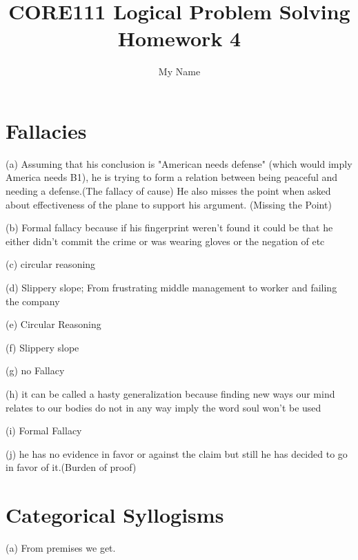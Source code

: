 \documentclass{article}
\title{CORE111 Logical Problem Solving\\Homework 4}
\author{My Name}
\begin{document}
\maketitle

\section{Fallacies}

(a) Assuming that his conclusion is "American needs defense" (which would imply America needs B1), he is trying to form a relation between being peaceful and needing a defense.(The fallacy of cause) He also misses the point when asked about effectiveness of the plane to support his argument. (Missing the Point)

(b) Formal fallacy because if his fingerprint weren't found it could be that he either didn't commit the crime or was wearing gloves or the negation of etc 

(c) circular reasoning

(d) Slippery slope; From frustrating middle management to worker and failing the company

(e) Circular Reasoning

(f) Slippery slope

(g) no Fallacy 

(h) it can be called a hasty generalization because finding new ways our mind relates to our bodies do not in any way imply the word soul won't be used

(i) Formal Fallacy

(j) he has no evidence in favor or against the claim but still he has decided to go in favor of it.(Burden of proof)

\section{Categorical Syllogisms}

(a)  From premises we get. \\
\end{document}
